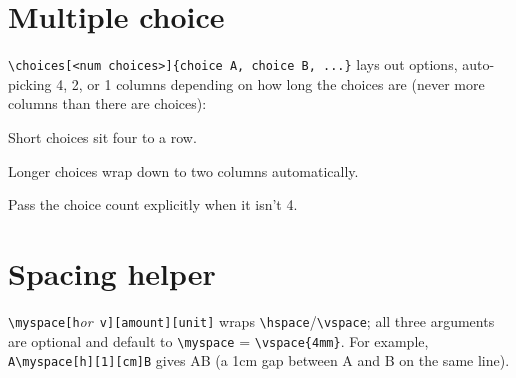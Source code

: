 \documentclass[a4paper, 10pt]{article}
\begin{document}
\section{Multiple choice}
\begin{problem}
\verb|\choices[<num choices>]{choice A, choice B, ...}| lays out options,
auto-picking 4, 2, or 1 columns depending on how long the choices are (never
more columns than there are choices):
\begin{subproblems}
	\item Short choices sit four to a row.
	\item Longer choices wrap down to two columns automatically.
	\item Pass the choice count explicitly when it isn't 4.
\end{subproblems}
\end{problem}

\section{Spacing helper}
\verb|\myspace[h|\emph{or}\verb| v][amount][unit]| wraps \verb|\hspace|/\verb|\vspace|;
all three arguments are optional and default to \verb|\myspace| = \verb|\vspace{4mm}|.
For example, \verb|A\myspace[h][1][cm]B| gives A\myspace[h][1][cm]B (a 1cm gap
between A and B on the same line).

\end{document}
